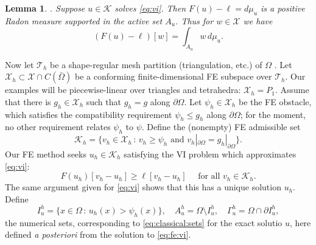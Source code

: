 \documentclass[]{interact}
\theoremstyle{plain}%
\newtheorem{lemma}[theorem]{Lemma}
\theoremstyle{definition}
\theoremstyle{remark}
\newcommand{\cK}{\mathcal{K}}
\newcommand{\cT}{\mathcal{T}}
\newcommand{\cX}{\mathcal{X}}
\begin{document}
\begin{lemma} \label{lem:measure}\cite[Theorem II.6.9]{KinderlehrerStampacchia1980}.  Suppose $u\in \cK$ solves \eqref{eq:vi}.  Then $F(u)-\ell=d\mu_u$ is a positive Radon measure supported in the active set $A_u$.  Thus for $w\in\cX$ we have
\begin{equation}
(F(u)-\ell)[w] = \int_{A_u} w\, d\mu_u. \label{eq:measure}
\end{equation}
\end{lemma}

Now let $\cT_h$ be a shape-regular mesh partition (triangulation, etc.) of $\Omega$ \cite{AinsworthOden2000,ElmanSilvesterWathen2014}.  Let $\cX_h \subset \cX \cap C(\bar\Omega)$ be a conforming finite-dimensional FE subspace over $\cT_h$.  Our examples will be piecewise-linear over triangles and tetrahedra: $\cX_h=P_1$.  Assume that there is $g_h\in\cX_h$ such that $g_h=g$ along $\partial \Omega$.  Let $\psi_h \in \cX_h$ be the FE obstacle, which satisfies the compatibility requirement $\psi_h \le g_h$ along $\partial\Omega$; for the moment, no other requirement relates $\psi_h$ to $\psi$.  Define the (nonempty) FE admissible set
\begin{equation} \label{eq:fe:admissible}
\cK_h = \{v_h \in \cX_h \,:\, v_h \ge \psi_h \text{ and } v_h|_{\partial \Omega} = g_h|_{\partial\Omega}\}.
\end{equation}
Our FE method seeks $u_h\in\cK_h$ satisfying the VI problem which approximates \eqref{eq:vi}:
\begin{equation} \label{eq:fe:vi}
F(u_h)[v_h - u_h] \ge \ell[v_h - u_h] \quad \text{ for all } v_h \in \cK_h.
\end{equation}
The same argument given for \eqref{eq:vi} shows that this has a unique solution $u_h$.  Define
\begin{equation}
  I_u^h = \{x \in \Omega \,:\, u_h(x) > \psi_h(x)\}, \quad A_u^h = \Omega \setminus I_u^h, \quad \Gamma_u^h = \Omega \cap \partial I_u^h, \label{eq:fe:sets}
\end{equation}
the numerical sets, corresponding to \eqref{eq:classical:sets} for the exact solutio $u$, here defined \emph{a posteriori} from the solution to \eqref{eq:fe:vi}.
\end{document}
